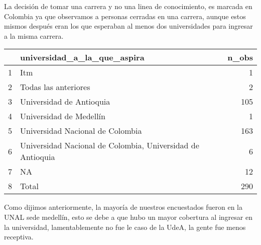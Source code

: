 \documentclass[
]{article}
\newenvironment{Shaded}{\begin{snugshade}}{\end{snugshade}}
\newcommand{\AttributeTok}[1]{\textcolor[rgb]{0.77,0.63,0.00}{#1}}
\newcommand{\CommentTok}[1]{\textcolor[rgb]{0.56,0.35,0.01}{\textit{#1}}}
\newcommand{\ConstantTok}[1]{\textcolor[rgb]{0.00,0.00,0.00}{#1}}
\newcommand{\FunctionTok}[1]{\textcolor[rgb]{0.00,0.00,0.00}{#1}}
\newcommand{\NormalTok}[1]{#1}
\newcommand{\OtherTok}[1]{\textcolor[rgb]{0.56,0.35,0.01}{#1}}
\newcommand{\StringTok}[1]{\textcolor[rgb]{0.31,0.60,0.02}{#1}}
\begin{document}
La decisión de tomar una carrera y no una linea de conocimiento, es
marcada en Colombia ya que observamos a personas cerradas en una
carrera, aunque estos mismos después eran los que esperaban al menos dos
universidades para ingresar a la misma carrera.

\begin{Shaded}
\end{Shaded}

\begin{table}[ht]
\centering
\begin{tabular}{rlr}
  \hline
 & universidad\_a\_la\_que\_aspira & n\_obs \\ 
  \hline
1 & Itm &   1 \\ 
  2 & Todas las anteriores &   2 \\ 
  3 & Universidad de Antioquia & 105 \\ 
  4 & Universidad de Medellín &   1 \\ 
  5 & Universidad Nacional de Colombia & 163 \\ 
  6 & Universidad Nacional de Colombia, Universidad de Antioquia &   6 \\ 
  7 & NA &  12 \\ 
  8 & Total & 290 \\ 
   \hline
\end{tabular}
\end{table}

Como dijimos anteriormente, la mayoría de nuestros encuestados fueron en
la UNAL sede medellín, esto se debe a que hubo un mayor cobertura al
ingresar en la universidad, lamentablemente no fue le caso de la UdeA,
la gente fue menos receptiva.

\begin{Shaded}
\end{Shaded}
\end{document}
